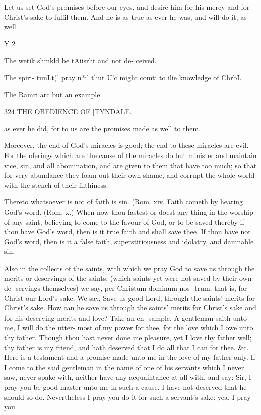 \documentclass{custom}
\begin{document}
{Let us set God's promises before our eyes, and desire 
him for his mercy and for Christ's sake to fulfil them. 
And he is as true as ever he was, and will do it, as well 

Y 2 

The wetik 
shmkld be 
tAiisrht and 
not de- 
ceived. 

The spiri- 
tunLt)' pray 
n*il tliut U'c 
might comti 
to ilie 
knowledge 
of ChrbL 

Tlie Ramri 
arc but an 
example. 


324
THE OBEDIENCE OF
[TYNDALE.

as ever he did, for to us are the promises made as well 
to them. 

Moreover, the end of God's miracles is good; the end to 
these miracles are evil. For the oferings which are the 
cause of the miracles do but minister and maintain vice, 
sin, and all abomination, and are given to them that have 
too much; so that for very abundance they foam out their 
own shame, and corrupt the whole world with the stench 
of their filthiness. 

Thereto whatsoever is not of faith is sin. (Rom. xiv. 
Faith cometh by hearing God's word. (Rom. x.) When 
now thou fastest or doest any thing in the worship of any
saint, believing to come to the favour of God, or to be saved 
thereby if thou have God's word, then is it true faith and 
shall save thee. If thou have not God's word, then is it a
false faith, superstitiousness and idolatry, and damnable 
sin. 

Also in the collects of the saints, with which we pray
God to save us through the merits or deservings of the 
saints, (which saints yet were not saved by their own de- 
servings themselves) we say, per Christum dominum nos-
trum; that is, for Christ our Lord's sake. We say, Save us 
good Lord, through the saints' merits for Christ's sake.
How can he save us through the saints' merits for Christ's 
sake and for his deserving merits and love? Take an en- 
sample. A gentleman saith unto me, I will do the utter- 
most of my power for thee, for the love which I owe unto 
thy father. Though thou hast never done me pleasure, 
yet I love thy father well; thy father is my friend, and hath 
deserved that I do all that I can for thee. &c. Here is a 
testament and a promise made unto me in the love of my 
father only. If I come to the said gentleman in the name 
of one of his servants which I never saw, never spake with, 
neither have any acquaintance at all with, and say: Sir, 
I pray you be good master unto me in such a cause. I
have not deserved that he should so do. Nevertheless I
pray you do it for such a servant's sake: yea, I pray you


}
\end{document}
